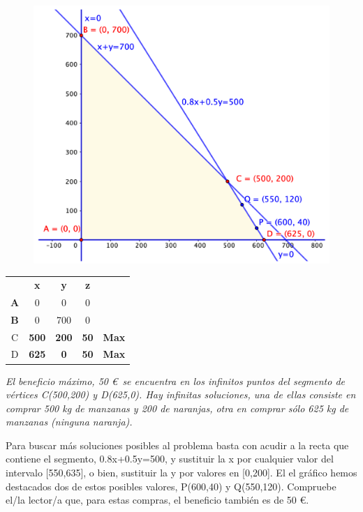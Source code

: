 \vspace{5mm} %
\begin{multicols}{2}
$\,$

\begin{figure}[H]
	\centering
	\includegraphics[width=.5\textwidth]{imagenes/img42.png}
\end{figure}

\begin{table}[H]
\centering
\begin{tabular}{ccccc}
 & \textbf{x} & \textbf{y} & \textbf{z} & \textbf{} \\
\textbf{A} & 0 & 0 & 0 &  \\
\textbf{B} & 0 & 700 & 0 &  \\
C & \textbf{500} & \textbf{200} & \textbf{50} & \textbf{Max} \\
D & \textbf{625} & \textbf{0} & \textbf{50} & \textbf{Max}
\end{tabular}
\end{table}
\emph{El beneficio máximo, 50 \euro $\,$ se encuentra en los infinitos puntos del segmento de vértices C(500,200) y D(625,0). Hay infinitas soluciones, una de ellas consiste en comprar 500 kg de manzanas y 200 de naranjas, otra en comprar  sólo 625 kg de manzanas (ninguna naranja).}
\end{multicols}

Para buscar más soluciones posibles al problema basta con acudir a la recta que contiene el segmento, 0.8x+0.5y=500, y sustituir la x por cualquier valor del intervalo [550,635], o bien, sustituir la y por valores en [0,200]. El el gráfico hemos destacados dos de estos posibles valores, P(600,40) y Q(550,120). Compruebe el/la lector/a que, para estas compras, el beneficio también es de 50  \euro.


